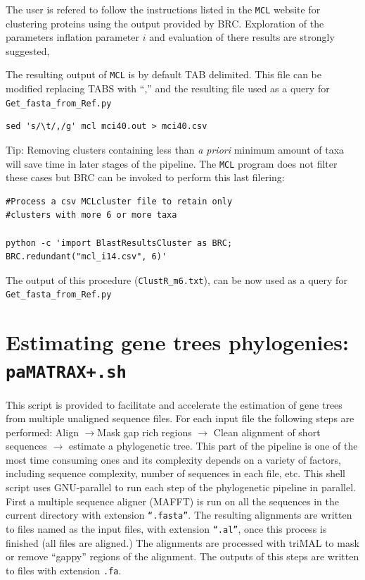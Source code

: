 \documentclass[10pt]{article}
\begin{document}
The user is refered to follow the instructions listed in the \texttt{MCL}
website for clustering proteins using the output provided by
BRC. Exploration of the parameters inflation parameter $i$ and
evaluation of there results are strongly suggested,

The resulting output of \texttt{MCL} is by default TAB delimited. This file can
be modified replacing TABS with ``,'' and the resulting file used as a
query for \texttt{Get\_fasta\_from\_Ref.py}

\begin{lstlisting} 
sed 's/\t/,/g' mcl mci40.out > mci40.csv
\end{lstlisting}

Tip: Removing clusters containing less than \emph{a priori} minimum
amount of taxa will save time in later stages of the pipeline. The \texttt{MCL}
program does not filter these cases but BRC can be invoked to perform
this last filering:

\begin{lstlisting} 
#Process a csv MCLcluster file to retain only
#clusters with more 6 or more taxa

python -c 'import BlastResultsCluster as BRC; BRC.redundant("mcl_i14.csv", 6)'

\end{lstlisting} 

The output of this procedure (\texttt{ClustR\_m6.txt}),
can be now used as a query for \texttt{Get\_fasta\_from\_Ref.py}

\section{Estimating gene trees phylogenies: \texttt{paMATRAX+.sh}}
This script is provided to facilitate and accelerate the estimation of 
gene trees from multiple unaligned sequence files. For each input file the following steps are performed:
Align $\rightarrow $Mask gap rich regions $\rightarrow$ Clean alignment
of short sequences $\rightarrow$ estimate a phylogenetic tree.  This
part of the pipeline is one of the most time consuming ones and its
complexity depends on a variety of factors, including sequence
complexity, number of sequences in each file, etc. This shell script
uses GNU-parallel to run each step of the phylogenetic pipeline in
parallel. First a multiple sequence aligner (MAFFT) is run on all the
sequences in the current directory with extension
\texttt{``.fasta''}. The resulting alignments are written to files
named as the input files, with extension \texttt{``.al''}, once this
process is finished (all files are aligned.) The alignments are
processed with triMAL to mask or remove ``gappy'' regions of the
alignment. The outputs of this steps are written to files with
extension \texttt{.fa}.
\end{document}
